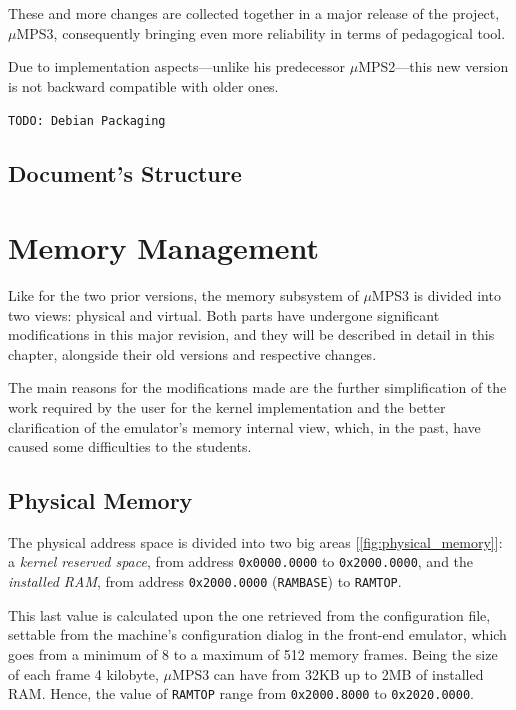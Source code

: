 \documentclass[12pt,a4paper,openright,twoside]{report}
\begin{document}
These and more changes are collected together in a major release of the project, $\mu$MPS3, consequently bringing even more reliability in terms of pedagogical tool.

Due to implementation aspects---unlike his predecessor $\mu$MPS2---this new version is not backward compatible with older ones.

\texttt{TODO: Debian Packaging}

\section{Document's Structure}

\chapter{Memory Management}
\lhead[\fancyplain{}{\bfseries\thepage}]{\fancyplain{}{\bfseries\rightmark}}
Like for the two prior versions, the memory subsystem of $\mu$MPS3 is divided into two views: physical and virtual.
Both parts have undergone significant modifications in this major revision, and they will be described in detail in this chapter, alongside their old versions and respective changes.

The main reasons for the modifications made are the further simplification of the work required by the user for the kernel implementation and the better clarification of the emulator's memory internal view, which, in the past, have caused some difficulties to the students.

\section{Physical Memory}
\label{chap:physical_memory}
The physical address space is divided into two big areas [\autoref{fig:physical_memory}]: a \textit{kernel reserved space}, from address \texttt{0x0000.0000} to \texttt{0x2000.0000}, and the \textit{installed RAM}, from address \texttt{0x2000.0000} (\texttt{RAMBASE}) to \texttt{RAMTOP}.

This last value is calculated upon the one retrieved from the configuration file, settable from the machine's configuration dialog in the front-end emulator, which goes from a minimum of 8 to a maximum of 512 memory frames.
Being the size of each frame 4 kilobyte, $\mu$MPS3 can have from 32KB up to 2MB of installed RAM.
Hence, the value of \texttt{RAMTOP} range from \texttt{0x2000.8000} to \texttt{0x2020.0000}.
\end{document}

